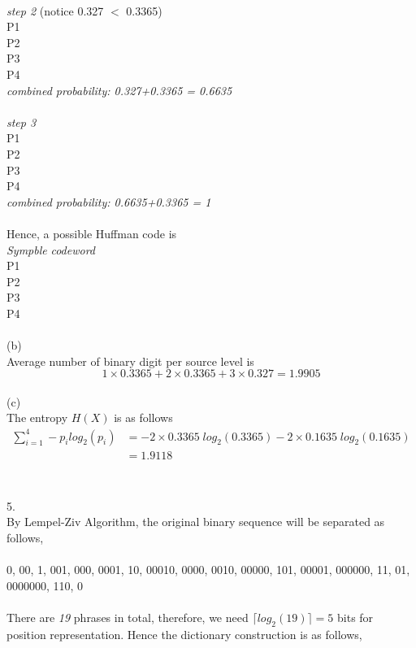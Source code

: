 \documentclass [12pt] {article}
\begin{document}
~\\
\emph{step 2} \; (notice 0.327 $<$ 0.3365)\\
P1  \\
P2  \;  \\
P3  \\
P4  \\
\emph{combined probability: 0.327+0.3365 = 0.6635}\\
~\\
\emph{step 3}\\
P1  \: \: \\
P2  \; \\
P3  \\
P4  \\
\emph{combined probability: 0.6635+0.3365 = 1}\\
~\\
Hence, a possible Huffman code is\\
\emph{Sympble} \; \; \emph{codeword}\\
P1\; \;  \; \; \; \; \\
P2\; \;  \; \; \; \; \\
P3\; \;  \; \; \; \; \\
P4\; \;  \; \; \; \; \\
~\\
(b)\\
Average number of binary digit per source level is
$$ 1\times 0.3365 + 2 \times 0.3365 + 3 \times 0.327 = 1.9905 $$
~\\
(c)\\
The entropy $H(X)$ is as follows\\
\begin{align*}
\sum\limits_{i=1}^4 -p_i log_2(p_i)&= -2 \times 0.3365\;log_2(0.3365) - 2 \times 0.1635\;log_2(0.1635)\\
&= 1.9118\\
\end{align*}
~\\
~\\
5. \\
By Lempel-Ziv Algorithm, the original binary sequence will be separated as follows, \\
~\\
0, 00, 1, 001, 000, 0001, 10, 00010, 0000, 0010, 00000, 101, 00001, 000000, 11, 01, 0000000, 110, 0\\
~\\
There are \emph{19} phrases in total, therefore, we need $\lceil log_2(19) \rceil = 5$ bits for position representation. Hence the dictionary construction is as follows,\\
\end{document}
